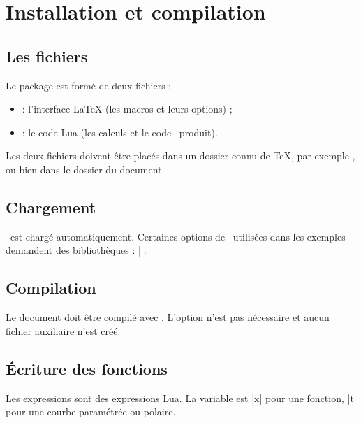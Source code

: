 \section{Installation et compilation}

\subsection{Les fichiers}

Le package est formé de deux fichiers :
\begin{itemize}
  \item {} : l'interface \LaTeX{} (les macros et leurs options) ;
  \item {} : le code Lua (les calculs et le code \TIKZ\ produit).
\end{itemize}

Les deux fichiers doivent être placés dans un dossier connu de \TeX{}, par exemple , ou bien dans le dossier du document.

\subsection{Chargement}

\begin{tkzltxexample}[]
\usepackage{tkz-fn}         %
\usepackage[fr]{tkz-fn}     %
\usepackage[us]{tkz-fn}     %
\end{tkzltxexample}

\TIKZ\ est chargé automatiquement. Certaines options de \TIKZ\ utilisées dans les exemples demandent des bibliothèques : |\usetikzlibrary{arrows,patterns}|.

\subsection{Compilation}

Le document doit être compilé avec . L'option  n'est pas nécessaire et aucun fichier auxiliaire n'est créé.

\subsection{Écriture des fonctions}

Les expressions sont des expressions Lua. La variable est |x| pour une fonction, |t| pour une courbe paramétrée ou polaire.

